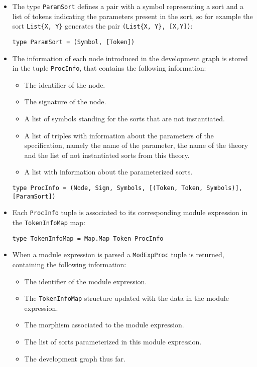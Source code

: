 \begin{itemize}

\item The type \verb"ParamSort" defines a pair with a symbol representing
a sort and a list of tokens indicating the parameters present in the sort,
so for example the sort \verb"List{X, Y}" generates the pair
\verb"(List{X, Y}, [X,Y])":

{\codesize
\begin{verbatim}
type ParamSort = (Symbol, [Token])
\end{verbatim}
}

\item The information of each node introduced
in the development graph is stored in the tuple \verb"ProcInfo", that
contains the following information:

\begin{itemize}
\item The identifier of the node.
\item The signature of the node.
\item A list of symbols standing for the sorts that are not instantiated.
\item A list of triples with information about the parameters of the
specification, namely the name of the parameter, the name of the theory
and the list of not instantiated sorts from this theory.
\item A list with information about the parameterized sorts.
\end{itemize}

{\codesize
\begin{verbatim}
type ProcInfo = (Node, Sign, Symbols, [(Token, Token, Symbols)], [ParamSort])
\end{verbatim}
}

\item Each \verb"ProcInfo" tuple is associated to its corresponding module
expression in the \verb"TokenInfoMap" map:

{\codesize
\begin{verbatim}
type TokenInfoMap = Map.Map Token ProcInfo
\end{verbatim}
}

\item When a module expression is parsed a \verb"ModExpProc" tuple is
returned, containing the following information:

\begin{itemize}
\item The identifier of the module expression.
\item The \verb"TokenInfoMap" structure updated with the data
in the module expression.
\item The morphism associated to the module expression.
\item The list of sorts parameterized in this module expression.
\item The development graph thus far.
\end{itemize}


\end{itemize}
